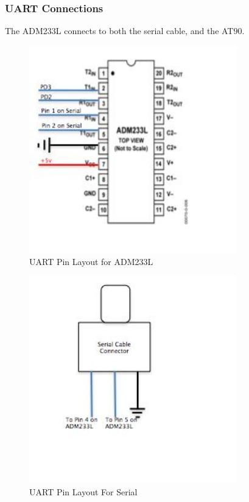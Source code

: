 \subsubsection{UART Connections}
The ADM233L connects to both the serial cable, and the AT90. 
\begin{figure}[h]
  \begin{center}
    \includegraphics[width=90mm]{imageSources/uartConnect1.png}
  \end{center}
  \caption{UART Pin Layout for ADM233L} 
  \label{uartConnect1}
\end{figure}

\begin{figure}[h]
  \begin{center}
    \includegraphics[width=90mm]{imageSources/uartConnect2.png}
  \end{center}
  \caption{UART Pin Layout For Serial} 
  \label{uartConnect2}
\end{figure}

